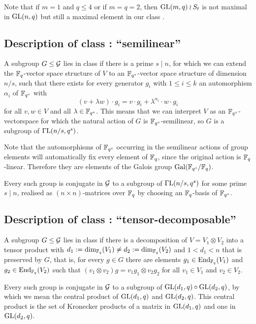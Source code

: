 Note that if $m = 1$ and $q \le 4$ or if $m=q=2$, then $\GL(m,q) \wr S_t$
is not maximal in $\GL(n,q)$ but still a maximal element in our class
.

\subsection{Description of class : ``semilinear''}
\label{descC3}

\desc
A subgroup $G \le \mathcal{G}$ lies in class  if there is a prime $s \mid n$,
for which we can extend the $\mathbb{F}_q$-vector space structure of
$V$ to an $\mathbb{F}_{q^s}$-vector space structure of dimension
$n/s$, such that there exists for every generator 
$g_i$ with $1 \le i \le k$ 
an automorphism $\alpha_i$ of $\mathbb{F}_{q^s}$ with
\[ (v+\lambda w)\cdot g_i = v \cdot g_i + \lambda^{\alpha_i} \cdot w \cdot
g_i\]
for all $v,w \in V$ and all $\lambda \in \mathbb{F}_{q^s}$. This means that we
can interpret $V$ as an $\mathbb{F}_{q^s}$-vectorspace for which the natural action
of $G$ is $\mathbb{F}_{q^s}$-semilinear, so $G$ is a subgroup of $\GGL(n/s,q^s)$.

Note that the automorphisms of $\mathbb{F}_{q^s}$ occurring in the semilinear
actions of group elements will automatically fix every element of $\mathbb{F}_q$, 
since the original action is $\mathbb{F}_q$-linear. Therefore they are elements of
the Galois group $\Gal(\F_{q^s}/\F_q)$.

\stru
Every such group is conjugate in $\mathcal{G}$ to a subgroup of $\GGL(n/s,q^s)$
for some prime $s \mid n$, 
realised as $(n \times n)$-matrices over $\mathbb{F}_q$ by choosing an 
$\mathbb{F}_q$-basis of $\mathbb{F}_{q^s}$.

\subsection{Description of class : ``tensor-decomposable''}
\label{descC4}

\desc
A subgroup $G \le \mathcal{G}$ lies in class  if there is a decomposition
of $V = V_1 \otimes V_2$ into a tensor product with $d_1 := \dim_{\mathbb{F}_q}(V_1)
\neq d_2 := \dim_{\mathbb{F}_q}(V_2)$ and $1 < d_1 < n$ that is preserved by $G$, 
that is, for every $g \in
G$ there are elements $g_1 \in \End_{\F_q}(V_1)$ and $g_2 \in
\End_{\F_q}(V_2)$ such that $(v_1 \otimes v_2) g = v_1 g_1 \otimes v_2 g_2$
for all $v_1 \in V_1$ and $v_2 \in V_2$.

\stru
Every such group is conjugate in $\mathcal{G}$ to a subgroup of $\GL(d_1,q)
\circ \GL(d_2,q)$, by which we mean the central product of $\GL(d_1,q)$ and
$\GL(d_2,q)$. This central product is the set of Kronecker products of
a matrix in $\GL(d_1,q)$ and one in $\GL(d_2,q)$.


